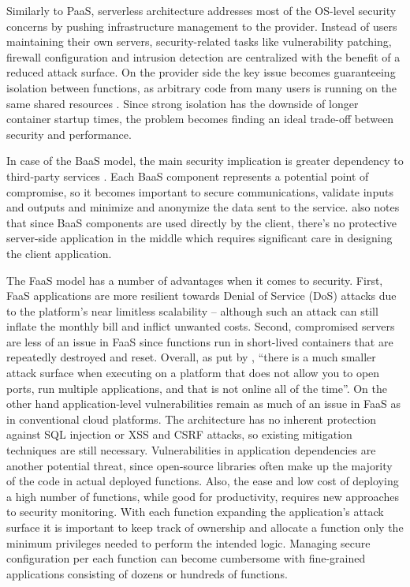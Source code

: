 Similarly to PaaS, serverless architecture addresses most of the OS-level security concerns by pushing infrastructure management to the provider. Instead of users maintaining their own servers, security-related tasks like vulnerability patching, firewall configuration and intrusion detection are centralized with the benefit of a reduced attack surface. On the provider side the key issue becomes guaranteeing isolation between functions, as arbitrary code from many users is running on the same shared resources \parencite{mcgrath17implement}. Since strong isolation has the downside of longer container startup times, the problem becomes finding an ideal trade-off between security and performance. \parencite{van2017spec}

In case of the BaaS model, the main security implication is greater dependency to third-party services \parencite{segal18risks}. Each BaaS component represents a potential point of compromise, so it becomes important to secure communications, validate inputs and outputs and minimize and anonymize the data sent to the service. \textcite{robert2016serverlessarchitectures} also notes that since BaaS components are used directly by the client, there's no protective server-side application in the middle which requires significant care in designing the client application.

The FaaS model has a number of advantages when it comes to security. First, FaaS applications are more resilient towards Denial of Service (DoS) attacks due to the platform's near limitless scalability -- although such an attack can still inflate the monthly bill and inflict unwanted costs. Second, compromised servers are less of an issue in FaaS since functions run in short-lived containers that are repeatedly destroyed and reset. Overall, as put by \textcite{wagner16resilient}, ``there is a much smaller attack surface when executing on a platform that does not allow you to open ports, run multiple applications, and that is not online all of the time''. On the other hand application-level vulnerabilities remain as much of an issue in FaaS as in conventional cloud platforms. The architecture has no inherent protection against SQL injection or XSS and CSRF attacks, so existing mitigation techniques are still necessary. Vulnerabilities in application dependencies are another potential threat, since open-source libraries often make up the majority of the code in actual deployed functions. Also, the ease and low cost of deploying a high number of functions, while good for productivity, requires new approaches to security monitoring. With each function expanding the application's attack surface it is important to keep track of ownership and allocate a function only the minimum privileges needed to perform the intended logic. Managing secure configuration per each function can become cumbersome with fine-grained applications consisting of dozens or hundreds of functions. \parencite{podjarny17security}

